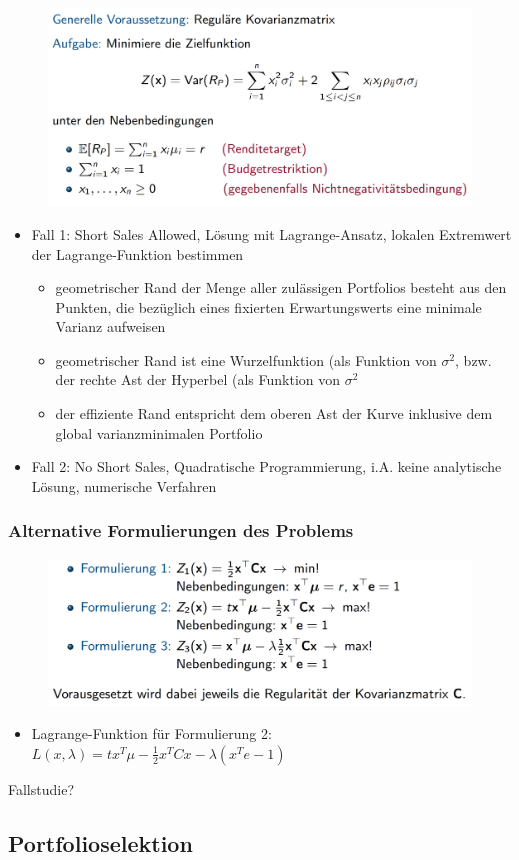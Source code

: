 \documentclass[12pt]{report}
\theoremstyle{dotless}
\theoremstyle{definition}
\begin{document}
\begin{figure}[H]
\centering
\includegraphics[width=\textwidth]{Bilder/Minimierungsproblem.png}
\end{figure}

\begin{itemize}
	\item Fall 1: Short Sales Allowed, L\"osung mit Lagrange-Ansatz, lokalen Extremwert der Lagrange-Funktion bestimmen
	\begin{itemize}
		\item geometrischer Rand der Menge aller zul\"assigen Portfolios besteht aus den Punkten, die bez\"uglich eines fixierten Erwartungswerts eine minimale Varianz aufweisen
		\item geometrischer Rand ist eine Wurzelfunktion (als Funktion von $\sigma^2$, bzw. der rechte Ast der Hyperbel (als Funktion von $\sigma^2$
		\item der effiziente Rand entspricht dem oberen Ast der Kurve inklusive dem global varianzminimalen Portfolio
	\end{itemize}
	\item Fall 2: No Short Sales, Quadratische Programmierung, i.A. keine analytische L\"osung, numerische Verfahren
\end{itemize}

\subsubsection{Alternative Formulierungen des Problems}

\begin{figure}[H]
\centering
\includegraphics[width=\textwidth]{Bilder/alternativeFormulierungen.png}
\end{figure}

\begin{itemize}
	\item Lagrange-Funktion f\"ur Formulierung 2: \\ $L(x, \lambda) = tx^T \mu - \frac{1}{2} x^T Cx - \lambda (x^T e - 1)$ 
\end{itemize}

Fallstudie? \\

\subsection{Portfolioselektion}
\end{document}
